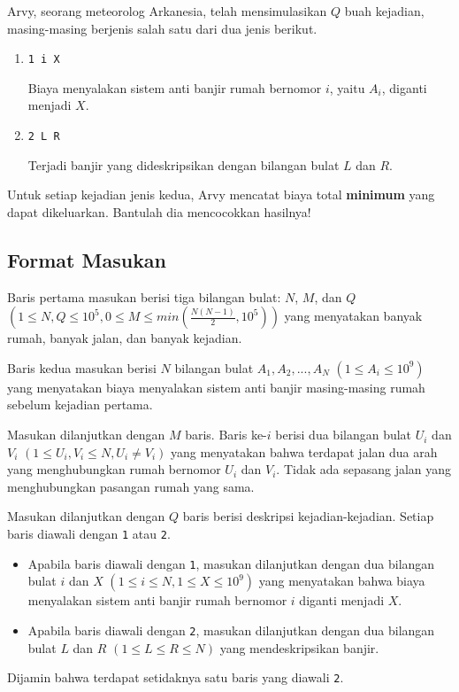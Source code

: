 \documentclass{article}
\begin{document}
Arvy, seorang meteorolog Arkanesia, telah mensimulasikan $Q$ buah kejadian, masing-masing berjenis salah satu dari dua jenis berikut.
\begin{enumerate}
    \item \verb|1 i X|
    
    Biaya menyalakan sistem anti banjir rumah bernomor $i$, yaitu $A_i$, diganti menjadi $X$.
    \item \verb|2 L R|
    
    Terjadi banjir yang dideskripsikan dengan bilangan bulat $L$ dan $R$.
\end{enumerate}

Untuk setiap kejadian jenis kedua, Arvy mencatat biaya total \textbf{minimum} yang dapat dikeluarkan. Bantulah dia mencocokkan hasilnya!

\subsection*{Format Masukan}
Baris pertama masukan berisi tiga bilangan bulat: $N$, $M$, dan $Q$ $(1 \leq N, Q \leq 10^5, 0 \leq M \leq min(\frac{N(N-1)}{2}, 10^5))$ yang menyatakan banyak rumah, banyak jalan, dan banyak kejadian.

Baris kedua masukan berisi $N$ bilangan bulat $A_1, A_2, ..., A_N$ $(1 \leq A_i \leq 10^9)$ yang menyatakan biaya menyalakan sistem anti banjir masing-masing rumah sebelum kejadian pertama.

Masukan dilanjutkan dengan $M$ baris. Baris ke-$i$ berisi dua bilangan bulat $U_i$ dan $V_i$ $(1 \leq U_i, V_i \leq N, U_i \neq V_i)$ yang menyatakan bahwa terdapat jalan dua arah yang menghubungkan rumah bernomor $U_i$ dan $V_i$. Tidak ada sepasang jalan yang menghubungkan pasangan rumah yang sama.

Masukan dilanjutkan dengan $Q$ baris berisi deskripsi kejadian-kejadian. Setiap baris diawali dengan \verb|1| atau \verb|2|.
\begin{itemize}
    \item Apabila baris diawali dengan \verb|1|, masukan dilanjutkan dengan dua bilangan bulat $i$ dan $X$ $(1 \leq i \leq N, 1 \leq X \leq 10^9)$ yang menyatakan bahwa biaya menyalakan sistem anti banjir rumah bernomor $i$ diganti menjadi $X$.
    \item Apabila baris diawali dengan \verb|2|, masukan dilanjutkan dengan dua bilangan bulat $L$ dan $R$ $(1 \leq L \leq R \leq N)$ yang mendeskripsikan banjir.
\end{itemize}
Dijamin bahwa terdapat setidaknya satu baris yang diawali \verb|2|.
\end{document}
